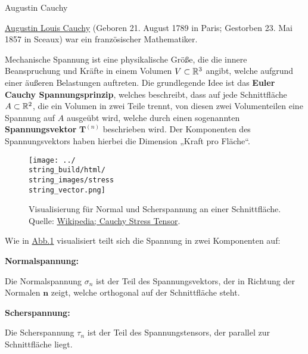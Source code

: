 \begin{emphBox}{Augustin Cauchy}{}

\par
\href{https://de.wikipedia.org/wiki/Augustin-Louis\_Cauchy}{Augustin Louis Cauchy} (Geboren 21. August 1789 in Paris; Gestorben 23. Mai 1857 in Sceaux) war ein französischer Mathematiker.
\end{emphBox}

\par
Mechanische Spannung ist eine physikalische Größe, die die innere Beanspruchung und Kräfte in einem Volumen \(V\subset\mathbb{R}^3\) angibt, welche aufgrund einer äußeren Belastungen auftreten.
Die grundlegende Idee ist das \textbf{Euler Cauchy Spannungsprinzip}, welches beschreibt, dass auf jede Schnittfläche \(A\subset\mathbb{R}^2\), die ein Volumen in zwei Teile trennt, von diesen zwei Volumenteilen eine Spannung auf \(A\) ausgeübt wird, welche durch einen sogenannten \textbf{Spannungsvektor} \(\mathbf{T}^{(n)}\) beschrieben wird.
Der Komponenten des Spannungsvektors haben hierbei die Dimension „Kraft pro Fläche“.

\begin{figure}[htbp]
\centering


\noindent\texttt{[image: ../\\string\_build/html/\\string\_images/stress\\string\_vector.png]}
\caption{Visualisierung für Normal  und Scherspannung an einer Schnittfläche. Quelle: \href{https://en.wikipedia.org/wiki/Cauchy\_stress\_tensor}{Wikipedia; Cauchy Stress Tensor}.}\label{\detokenize{vektoranalysis/tensor:fig-stress}}\end{figure}

\par
Wie in \hyperref[\detokenize{vektoranalysis/tensor:fig-stress}]{Abb.\@ \ref{\detokenize{vektoranalysis/tensor:fig-stress}}} visualisiert teilt sich die Spannung in zwei Komponenten auf:

\par
\textbf{Normalspannung:}

\par
Die Normalspannung \(\sigma_n\) ist der Teil des Spannungsvektors, der in Richtung der Normalen \(\mathbf{n}\) zeigt, welche orthogonal auf der Schnittfläche steht.

\par
\textbf{Scherspannung:}

\par
Die Scherspannung \(\tau_n\) ist der Teil des Spannungstensors, der parallel zur Schnittfläche liegt.

